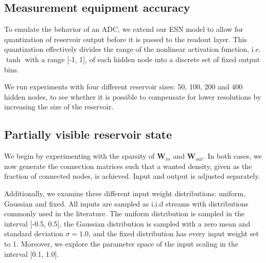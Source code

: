 \subsection{Measurement equipment accuracy}

To emulate the behavior of an ADC, we extend our ESN model to allow for
quantization of reservoir output before it is passed to the readout layer. This
quantization effectively divides the range of the nonlinear activation function,
i.e. $\tanh$ with a range [-1, 1], of each hidden node into a discrete set of
fixed output bins.

We run experiments with four different reservoir sizes: 50, 100, 200 and 400
hidden nodes, to see whether it is possible to compensate for lower resolutions
by increasing the size of the reservoir.

\subsection{Partially visible reservoir state}

We begin by experimenting with the sparsity of $\mathbf{W}_{in}$ and
$\mathbf{W}_{out}$. In both cases, we now generate the connection matrices such
that a wanted density, given as the fraction of connected nodes, is
achieved. Input and output is adjusted separately.

Additionally, we examine three different input weight distributions: uniform,
Gaussian and fixed. All inputs are sampled as i.i.d streams with distributions
commonly used in the literature. The uniform distribution is sampled in the
interval [-0.5, 0.5], the Gaussian distribution is sampled with a zero mean and
standard deviation $\sigma = 1.0$, and the fixed distribution has every input
weight set to 1. Moreover, we explore the parameter space of the input scaling
in the interval [0.1, 1.0].

